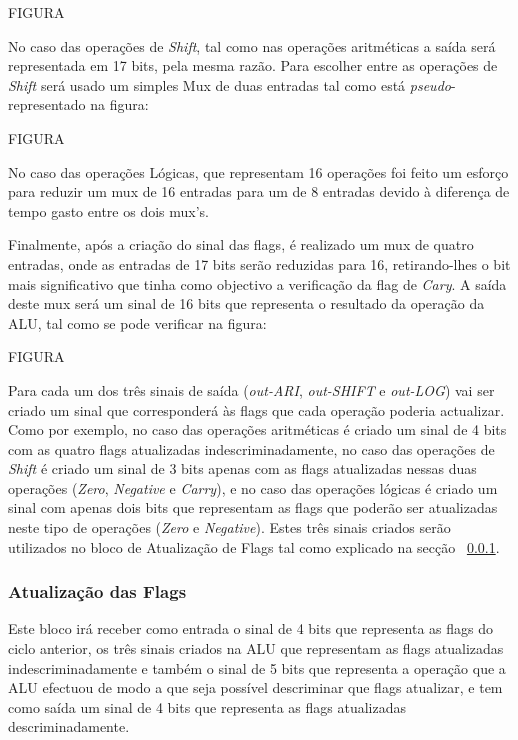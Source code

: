 \documentclass[11pt]{article}
\numberwithin{equation}{section}
\begin{document}
FIGURA

No caso das operações de \textit{Shift}, tal como nas operações aritméticas a saída será representada em 17 bits, pela mesma razão. Para escolher entre as operações de \textit{Shift} será usado um simples Mux de duas entradas tal como está \textit{pseudo}-representado na figura:

FIGURA

No caso das operações Lógicas, que representam 16 operações foi feito um esforço para reduzir um mux de 16 entradas para um de 8 entradas devido à diferença de tempo gasto entre os dois mux's.

Finalmente, após a criação do sinal das flags, é realizado um mux de quatro entradas, onde as entradas de 17 bits serão reduzidas para 16, retirando-lhes o bit mais significativo que tinha como objectivo a verificação da flag de \textit{Cary}. A saída deste mux será um sinal de 16 bits que representa o resultado da operação da ALU, tal como se pode verificar na figura:

FIGURA

Para cada um dos três sinais de saída (\textit{out-ARI}, \textit{out-SHIFT} e \textit{out-LOG}) vai ser criado um sinal que corresponderá às flags que cada operação poderia actualizar. Como por exemplo, no caso das operações aritméticas é criado um sinal de 4 bits com as quatro flags atualizadas indescriminadamente, no caso das operações de \textit{Shift} é criado um sinal de 3 bits apenas com as flags atualizadas nessas duas operações (\textit{Zero}, \textit{Negative} e \textit{Carry}), e no caso das operações lógicas é criado um sinal com apenas dois bits que representam as flags que poderão ser atualizadas neste tipo de operações (\textit{Zero} e \textit{Negative}). Estes três sinais criados serão utilizados no bloco de Atualização de Flags tal como explicado na secção ~\ref{subsec:act-flags}.

\subsubsection{Atualização das Flags}
\label{subsec:act-flags}

Este bloco irá receber como entrada o sinal de 4 bits que representa as flags do ciclo anterior, os três sinais criados na ALU que representam as flags atualizadas indescriminadamente e também o sinal de 5 bits que representa a operação que a ALU efectuou de modo a que seja possível descriminar que flags atualizar, e tem como saída um sinal de 4 bits que representa as flags atualizadas descriminadamente.
\end{document}
